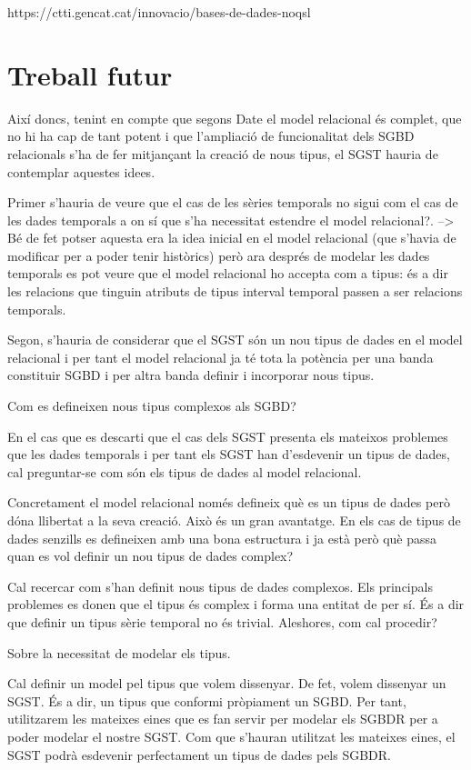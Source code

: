 https://ctti.gencat.cat/innovacio/bases-de-dades-noqsl


\section{Treball futur}




Així doncs, tenint en compte que segons Date el model relacional és complet, que no hi ha cap de tant potent i que l'ampliació de funcionalitat dels SGBD relacionals s'ha de fer mitjançant la creació de nous tipus, el SGST hauria de contemplar aquestes idees. 

Primer s'hauria de veure que el cas de les sèries temporals no sigui com el cas de les dades temporals a on sí que s'ha necessitat estendre el model relacional?. --> Bé de fet potser aquesta era la idea inicial en el model relacional (que s'havia de modificar per a poder tenir històrics) però ara després de modelar les dades temporals es pot veure que el model relacional ho accepta com a tipus: és a dir les relacions que tinguin atributs de tipus interval temporal passen a ser relacions temporals.

Segon, s'hauria de considerar que el SGST són un nou tipus de dades en el model relacional i per tant el model relacional ja té tota la potència per una banda constituir SGBD i per altra banda definir i incorporar nous tipus.


Com es defineixen nous tipus complexos als SGBD?

En el cas que es descarti que el cas dels SGST presenta els mateixos problemes que les dades temporals i per tant els SGST han d'esdevenir un tipus de dades, cal preguntar-se com són els tipus de dades al model relacional.

Concretament el model relacional només defineix què es un tipus de dades però dóna llibertat a la seva creació. Això és un gran avantatge. En els cas de tipus de dades senzills es defineixen amb una bona estructura i ja està però què passa quan es vol definir un nou tipus de dades complex?

Cal recercar com s'han definit nous tipus de dades complexos. Els principals problemes es donen que el tipus és complex i forma una entitat de per sí. És a dir que definir un tipus sèrie temporal no és trivial. Aleshores, com cal procedir?



Sobre la necessitat de modelar els tipus.

Cal definir un model pel tipus que volem dissenyar.
De fet, volem dissenyar un SGST. És a dir, un tipus que conformi pròpiament un SGBD. Per tant, utilitzarem les mateixes eines que es fan servir per modelar els SGBDR per a poder modelar el nostre SGST. Com que s'hauran utilitzat les mateixes eines, el SGST podrà esdevenir perfectament un tipus de dades pels SGBDR.

